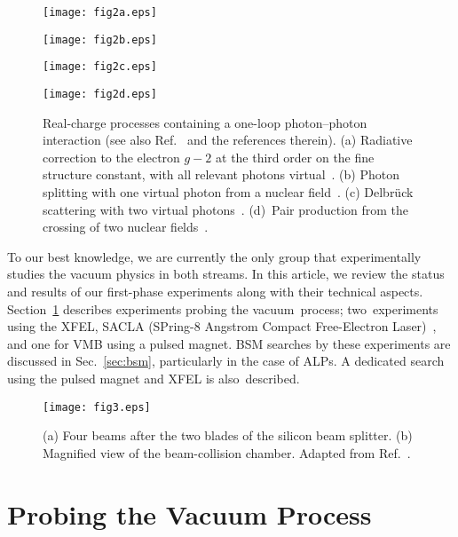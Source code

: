 \documentclass[10pt,a4paper]{article}%
\begin{document}
\begin{figure}[!t]
\begin{minipage}{0.24\hsize}
\centering
\texttt{[image: fig2a.eps]}
\end{minipage}
\begin{minipage}{0.24\hsize}
\centering
\texttt{[image: fig2b.eps]}
\end{minipage}
\begin{minipage}{0.24\hsize}
\centering
\texttt{[image: fig2c.eps]}
\end{minipage}
\begin{minipage}{0.24\hsize}
\centering
\texttt{[image: fig2d.eps]}
\end{minipage}
\caption{
Real-charge processes containing a one-loop photon--photon interaction (see also Ref.~\cite{schlenvoigt} and the references therein).
(a) Radiative correction to the electron $g-2$ at the third order on the fine structure constant, with all relevant photons virtual~\cite{g-2_el,g-2_el_mea}.
(b) Photon splitting with one virtual photon from a nuclear field~\cite{ps}.
(c) Delbr\"uck scattering with two virtual photons~\cite{ds}.
(d)~Pair production from the crossing of two nuclear fields~\cite{upc}.
\label{fig:real_charge}}
\end{figure}   

To our best knowledge, we are currently the only group that experimentally studies the vacuum physics in both streams.
In this article, we review the status and results of our first-phase experiments along with their technical aspects.
Section~\ref{sec:optics} describes experiments probing the vacuum~process; two~experiments using the XFEL, SACLA (SPring-8 Angstrom Compact Free-Electron Laser)~\mbox{\cite{sacla1, sacla2}}, and one for VMB using a pulsed magnet.
BSM searches by these experiments are discussed in Sec.~\ref{sec:bsm}, particularly in the case of ALPs.
A dedicated search using the pulsed magnet and XFEL is also~described.

\begin{figure}[!t]
\centering
\texttt{[image: fig3.eps]}
\caption{
(a) Four beams after the two blades of the silicon beam splitter.
(b) Magnified view of the beam-collision chamber.
Adapted from Ref.~\cite{gg1}.
\label{fig:gg_setup}}
\end{figure}   

\section{Probing the Vacuum Process}\label{sec:optics}
\end{document}
